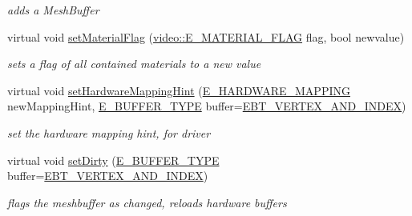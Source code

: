 \begin{DoxyCompactItemize}
\begin{DoxyCompactList}\small\item\em adds a Mesh\+Buffer \end{DoxyCompactList}\item 
\mbox{\label{structirr_1_1scene_1_1SMesh_a0ca30440aef6ca66dfc177b2a0e41e52}} 
virtual void \hyperlink{structirr_1_1scene_1_1SMesh_a0ca30440aef6ca66dfc177b2a0e41e52}{set\+Material\+Flag} (\hyperlink{namespaceirr_1_1video_a8a3bc00ae8137535b9fbc5f40add70d3}{video\+::\+E\+\_\+\+M\+A\+T\+E\+R\+I\+A\+L\+\_\+\+F\+L\+AG} flag, bool newvalue)
\begin{DoxyCompactList}\small\item\em sets a flag of all contained materials to a new value \end{DoxyCompactList}\item 
\mbox{\label{structirr_1_1scene_1_1SMesh_a79839b08062bfcd283e441056bf846e6}} 
virtual void \hyperlink{structirr_1_1scene_1_1SMesh_a79839b08062bfcd283e441056bf846e6}{set\+Hardware\+Mapping\+Hint} (\hyperlink{namespaceirr_1_1scene_ac7d8ee8d77da75f2580bb9bb17231c27}{E\+\_\+\+H\+A\+R\+D\+W\+A\+R\+E\+\_\+\+M\+A\+P\+P\+I\+NG} new\+Mapping\+Hint, \hyperlink{namespaceirr_1_1scene_a8f59a89ffef0ad8e5b2c2cb874a93e8c}{E\+\_\+\+B\+U\+F\+F\+E\+R\+\_\+\+T\+Y\+PE} buffer=\hyperlink{namespaceirr_1_1scene_a8f59a89ffef0ad8e5b2c2cb874a93e8ca833624730c30cffccc121fe31aa0832c}{E\+B\+T\+\_\+\+V\+E\+R\+T\+E\+X\+\_\+\+A\+N\+D\+\_\+\+I\+N\+D\+EX})
\begin{DoxyCompactList}\small\item\em set the hardware mapping hint, for driver \end{DoxyCompactList}\item 
\mbox{\label{structirr_1_1scene_1_1SMesh_a3ffa0e6294be831ca5be6e6ff9829ca9}} 
virtual void \hyperlink{structirr_1_1scene_1_1SMesh_a3ffa0e6294be831ca5be6e6ff9829ca9}{set\+Dirty} (\hyperlink{namespaceirr_1_1scene_a8f59a89ffef0ad8e5b2c2cb874a93e8c}{E\+\_\+\+B\+U\+F\+F\+E\+R\+\_\+\+T\+Y\+PE} buffer=\hyperlink{namespaceirr_1_1scene_a8f59a89ffef0ad8e5b2c2cb874a93e8ca833624730c30cffccc121fe31aa0832c}{E\+B\+T\+\_\+\+V\+E\+R\+T\+E\+X\+\_\+\+A\+N\+D\+\_\+\+I\+N\+D\+EX})
\begin{DoxyCompactList}\small\item\em flags the meshbuffer as changed, reloads hardware buffers \end{DoxyCompactList}\end{DoxyCompactItemize}
